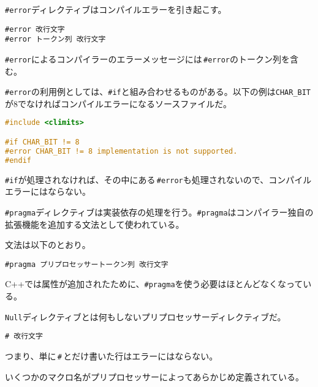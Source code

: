 
\texttt{\#error}ディレクティブはコンパイルエラーを引き起こす。

\begin{lstlisting}[style=grammar]
#error 改行文字
#error トークン列 改行文字
\end{lstlisting}

\texttt{\#error}によるコンパイラーのエラーメッセージには\,\texttt{\#error}のトークン列を含む。

\texttt{\#error}の利用例としては、\texttt{\#if}と組み合わせるものがある。以下の例は\texttt{CHAR\_BIT}が8でなければコンパイルエラーになるソースファイルだ。

\ifTombow\pagebreak\fi
\begin{lstlisting}[language={C++}]
#include <climits>

#if CHAR_BIT != 8
#error CHAR_BIT != 8 implementation is not supported.
#endif
\end{lstlisting}

\texttt{\#if}が処理されなければ、その中にある\,\texttt{\#error}も処理されないので、コンパイルエラーにはならない。


\texttt{\#pragma}ディレクティブは実装依存の処理を行う。\texttt{\#pragma}はコンパイラー独自の拡張機能を追加する文法として使われている。

文法は以下のとおり。

\begin{lstlisting}[style=grammar]
#pragma プリプロセッサートークン列 改行文字
\end{lstlisting}

C++では属性が追加されたために、\texttt{\#pragma}を使う必要はほとんどなくなっている。


\texttt{Null}ディレクティブとは何もしないプリプロセッサーディレクティブだ。

\begin{lstlisting}[style=grammar]
# 改行文字
\end{lstlisting}

つまり、単に\,\texttt{\#}\,とだけ書いた行はエラーにはならない。


いくつかのマクロ名がプリプロセッサーによってあらかじめ定義されている。

